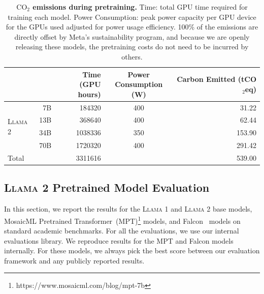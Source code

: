 \documentclass{article}
\newcommand{\anise}{\textsc{Llama 1}\xspace}
\newcommand{\cinnamon}{\textsc{Llama 2}\xspace}
\begin{document}
  \begin{table}[t!]
    \small
    \centering
    \setlength{\tabcolsep}{4pt} 
    \begin{tabular}{lrrcr}
    \toprule
     & &  \shortstack{Time \\ (GPU hours)} & \shortstack{Power \\ Consumption (W)}  & \shortstack{Carbon Emitted \\ (tCO$_2$eq)}   \\
    \midrule
    \multirow{4}{*}{\cinnamon} & 7B & 184320 & 400  & 31.22 \\
     &  13B & 368640 & 400  & 62.44 \\
    &  34B & 1038336 & 350  & 153.90 \\
     & 70B & 1720320 & 400  & 291.42 \\
    \midrule
     Total &  & 3311616 &  &  539.00 \\
    \bottomrule
    \end{tabular}
    \caption{
    \textbf{$\text{CO}_2$ emissions during pretraining.} Time: total GPU time required for training each model. Power Consumption: peak power capacity per GPU device for the GPUs used adjusted for power usage efficiency. 100\% of the emissions are directly offset by Meta's sustainability program, and because
    we are openly releasing these models, the pretraining costs do not need to be 
    incurred by others.
    \label{tab:co2}
    }
  \end{table}
  
\subsection{\cinnamon Pretrained Model Evaluation} \label{sec:pretraining_eval}

In this section, we report the results for the \anise and \cinnamon base models, MosaicML Pretrained Transformer~(MPT)\footnote{https://www.mosaicml.com/blog/mpt-7b} models, and Falcon~\citep{falcon40b} models  on standard academic benchmarks. For all the evaluations, we use our internal evaluations library. We reproduce results for the MPT and Falcon models internally. For these models, we always pick the best score between our evaluation framework and any publicly reported results. 
\end{document}
